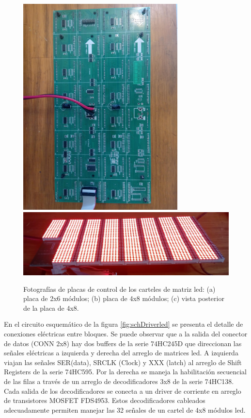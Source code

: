 \begin{figure}[H]
	\centering
	\includegraphics[width=0.75\textwidth, angle=270]{./Figures/cartel4x8.jpg}\\
	\includegraphics[width=1\textwidth]{./Figures/cartelledON.jpg}\\
	\caption{Fotografías de placas de control de los carteles de matriz led: (a) placa de 2x6 módulos; (b) placa de 4x8 módulos; (c) vista posterior de la placa de 4x8.}
	\label{fig:picsDriverled}
\end{figure}


En el circuito esquemático de la figura \ref{fig:schDriverled} se presenta el detalle de conexiones eléctricas entre bloques. Se puede observar que a la salida del conector de datos (CONN 2x8) hay dos buffers de la serie 74HC245D que direccionan las señales eléctricas a izquierda y derecha del arreglo de matrices led. A izquierda viajan las señales SER(data), SRCLK (Clock) y XXX (latch) al arreglo de Shift Registers de la serie 74HC595. Por la derecha se maneja la habilitación secuencial de las filas a través de un arreglo de decodificadores 3x8 de la serie 74HC138. Cada salida de los decodificadores se conecta a un driver de corriente en arreglo de transistores MOSFET FDS4953. Estos decodificadores cableados adecuadamente permiten manejar las 32 señales de un cartel de 4x8 módulos led. \\

